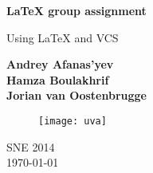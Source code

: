 \begin{titlepage}
    \begin{center}
        \vspace*{4cm}
        
        \LARGE
        \textbf{\LaTeX{} group assignment}
        
        \vspace{0.5cm}
        \large
        Using \LaTeX{} and VCS
        
        \vspace{1.5cm}
        
	\textbf{Andrey Afanas'yev}
	\\
	\textbf{Hamza Boulakhrif}
	\\
	 \textbf{Jorian van Oostenbrugge}
	
	\vspace{4.5cm}
	
	\begin{figure}[H]
    		\centering
    		\texttt{[image: uva]}
	\end{figure}
        
        \vfill
        
        \vspace{0.8cm}
	SNE 2014
	\\
        \today
        
    \end{center}
\end{titlepage}
